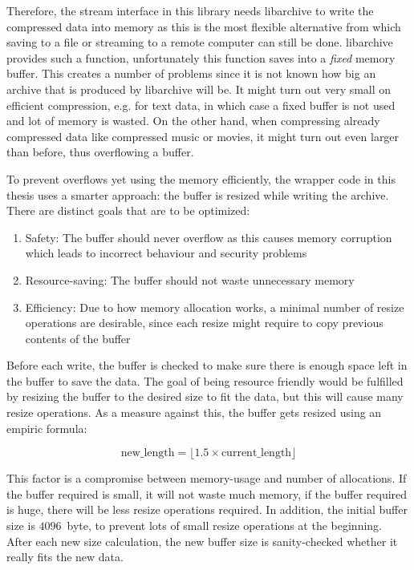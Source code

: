\documentclass[parskip=half]{scrreprt}
\begin{document}
Therefore, the stream interface in this library needs libarchive to write the
compressed data into memory as this is the most flexible alternative from which
saving to a file or streaming to a remote computer can still be done.
libarchive provides such a function, unfortunately this function saves into a
\emph{fixed} memory buffer. This creates a number of problems since it is not
known how big an archive that is produced by libarchive will be. It might turn
out very small on efficient compression, e.g. for text data, in which case a
fixed buffer is not used and lot of memory is wasted. On the other hand, when
compressing already compressed data like compressed music or movies, it might
turn out even larger than before, thus overflowing a buffer.

To prevent overflows yet using the memory efficiently, the wrapper code in this
thesis uses a smarter approach: the buffer is resized while writing the
archive. There are distinct goals that are to be optimized:

\begin{enumerate}
  \item Safety: The buffer should never overflow as this causes memory
    corruption which leads to incorrect behaviour and security problems
  \item Resource-saving: The buffer should not waste unnecessary memory
  \item Efficiency: Due to how memory allocation works, a minimal number
    of resize operations are desirable, since each resize might require
    to copy previous contents of the buffer
\end{enumerate}

Before each write, the buffer is checked to make sure there is enough space
left in the buffer to save the data. The goal of being resource friendly would
be fulfilled by resizing the buffer to the desired size to fit the data, but
this will cause many resize operations. As a measure against this, the buffer
gets resized using an empiric formula:

\begin{displaymath}
\text{new\_length} = \lfloor 1.5 \times \text{current\_length} \rfloor
\end{displaymath}

This factor is a compromise between memory-usage and number of allocations. If
the buffer required is small, it will not waste much memory, if the buffer
required is huge, there will be less resize operations required. In addition,
the initial buffer size is $4096$~byte, to prevent lots of small resize
operations at the beginning. After each new size calculation, the new buffer
size is sanity-checked whether it really fits the new data.
\end{document}
